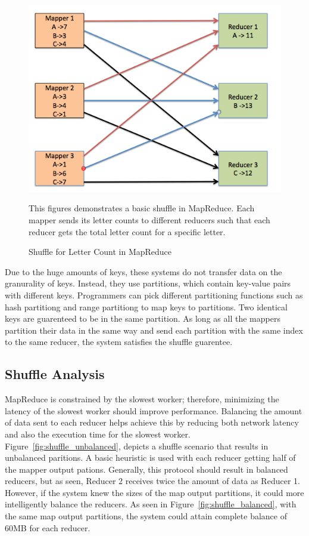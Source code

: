\begin{figure}[h]
\begin{center}
\includegraphics[scale=0.6]{./img/shuffle_basic.png}
\caption{Shuffle for Letter Count in MapReduce}
\label{fig:shuffle_basic}
\end{center}
This figures demonstrates a basic shuffle in MapReduce. 
Each mapper sends its letter counts to different reducers such that each reducer
gets the total letter count for a specific letter.
\end{figure}
Due to the huge amounts of keys, these systems do not transfer data on the granurality of keys.
Instead, they use partitions, which contain key-value pairs with different keys. Programmers can pick different partitioning functions such as hash partitiong and range partitiong to map keys to partitions. Two identical keys are guarenteed to be in the same partition. As long as all the mappers partition their data in the same way and send each partition with the same index to the same reducer, the system satisfies 
the shuffle guarentee. 

\subsection {Shuffle Analysis}

MapReduce is constrained by the slowest worker; therefore, minimizing the latency of the slowest worker should improve performance.
Balancing the amount of data sent to each reducer helps achieve this by reducing both network latency and also the execution time for the slowest worker.
Figure~\ref{fig:shuffle_unbalanced}, depicts a shuffle scenario that results in unbalanced paritions. A basic heuristic is used with each reducer getting half of the mapper output pations. Generally, this protocol should result in  balanced reducers, but as seen, Reducer 2 receives 
twice the amount of data as Reducer 1. However, if the system knew the sizes of the map output partitions,
it could more intelligently balance the reducers. As seen in Figure~\ref{fig:shuffle_balanced}, with the same map output partitions, the system could attain complete balance
of 60MB for each reducer.


